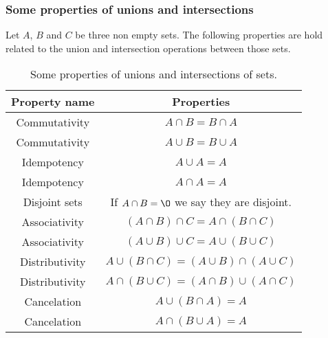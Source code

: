 \subsubsection{Some properties of unions and intersections}
Let $A$, $B$ and $C$ be three non empty sets. The following properties are hold related to the union and intersection operations between those sets.
\newpage
\bgroup
\def\arraystretch{1.5}
\def\tabcolsep{20}
\begin{table}[h!]
\centering
\begin{tabular}{|c|c|}
    \hline
    \textbf{Property name} & \textbf{Properties} \\
    \hline
    Commutativity & $A\cap B = B\cap A$ \\
    \hline
    Commutativity & $A\cup B = B\cup A$ \\
    \hline
    Idempotency & $A\cup A = A$ \\
    \hline
    Idempotency & $A\cap A = A$ \\
    \hline
    Disjoint sets & If $A\cap B = \O$ we say they are disjoint. \\
    \hline
    Associativity & $\left( A\cap B \right)\cap C = A\cap\left( B\cap C \right)$ \\
    \hline
    Associativity & $\left( A\cup B \right)\cup C = A\cup\left( B\cup C \right)$ \\
    \hline
    Distributivity & $A\cup\left( B\cap C\right) = \left( A\cup B \right)\cap\left( A\cup C \right)$ \\
    \hline
    Distributivity & $A\cap\left( B\cup C\right) = \left( A\cap B \right)\cup\left( A\cap C \right)$ \\
    \hline
    Cancelation & $A\cup\left( B\cap A \right) = A$ \\
    \hline
    Cancelation & $A\cap\left( B\cup A \right) = A$ \\
    \hline
\end{tabular}
\caption{Some properties of unions and intersections of sets.}
\end{table}
\egroup

